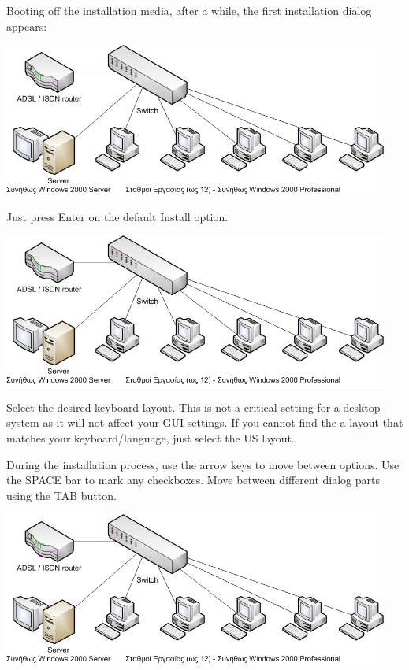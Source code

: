 \documentclass[a4paper,twoside,12pt]{article}
\begin{document}
Booting off the installation media, after a while, the first installation dialog appears:

\begin{center}
\includegraphics[width=0.95\textwidth]{images/main/school-lab}
\end{center}

Just press Enter on the default Install option.

\begin{center}
\includegraphics[width=0.95\textwidth]{images/main/school-lab}
\end{center}

Select the desired keyboard layout. This is not a critical setting for a desktop system as it will not affect your GUI settings. If you cannot find the a layout that matches your keyboard/language, just select the US layout.

During the installation process, use the arrow keys to move between options. Use the SPACE bar to mark any checkboxes. Move between different dialog parts using the TAB button.

\begin{center}
\includegraphics[width=0.95\textwidth]{images/main/school-lab}
\end{center}
\end{document}
